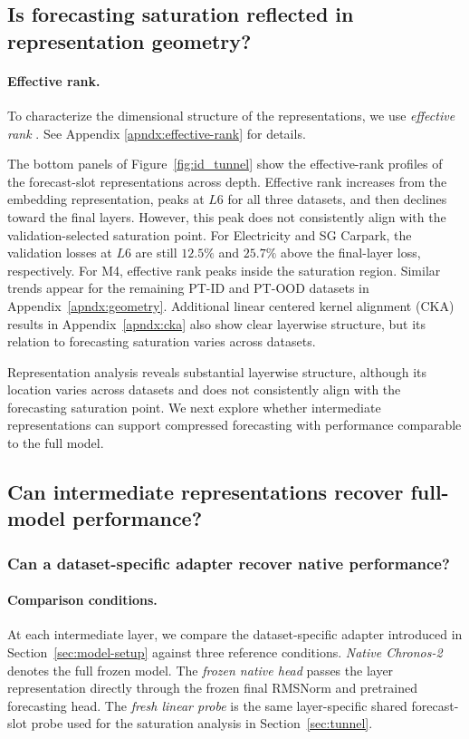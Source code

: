 \documentclass{article}
\begin{document}
\subsection{Is forecasting saturation reflected in representation geometry?}
\label{sec:geometry}

\paragraph{Effective rank.} To characterize the dimensional structure of the representations, we use \textit{effective rank} \citep{7098875}. See Appendix \ref{apndx:effective-rank} for details.

The bottom panels of Figure~\ref{fig:id_tunnel} show the effective-rank profiles of the forecast-slot representations across depth. Effective rank increases from the embedding representation, peaks at \(L6\) for all three datasets, and then declines toward the final layers. However, this peak does not consistently align with the validation-selected saturation point. For Electricity and SG Carpark, the validation losses at \(L6\) are still \(12.5\%\) and \(25.7\%\) above the final-layer loss, respectively. For M4, effective rank peaks inside the saturation region. Similar trends appear for the remaining PT-ID and PT-OOD datasets in Appendix~\ref{apndx:geometry}. Additional linear centered kernel alignment (CKA) results in Appendix~\ref{apndx:cka} also show clear layerwise structure, but its relation to forecasting saturation varies across datasets.

Representation analysis reveals substantial layerwise structure, although its location varies across datasets and does not consistently align with the forecasting saturation point. We next explore whether intermediate representations can support compressed forecasting with performance comparable to the full model.

\subsection{Can intermediate representations recover full-model performance?}
\label{sec:recover-chronos-performance}

\subsubsection{Can a dataset-specific adapter recover native performance?}
\label{sec:dataset-specific-adapter}

\paragraph{Comparison conditions.}
At each intermediate layer, we compare the dataset-specific adapter introduced in Section~\ref{sec:model-setup} against three reference conditions. \textit{Native Chronos-2} denotes the full frozen model. The \textit{frozen native head} passes the layer representation directly through the frozen final RMSNorm and pretrained forecasting head. The \textit{fresh linear probe} is the same layer-specific shared forecast-slot probe used for the saturation analysis in Section~\ref{sec:tunnel}.
\end{document}
